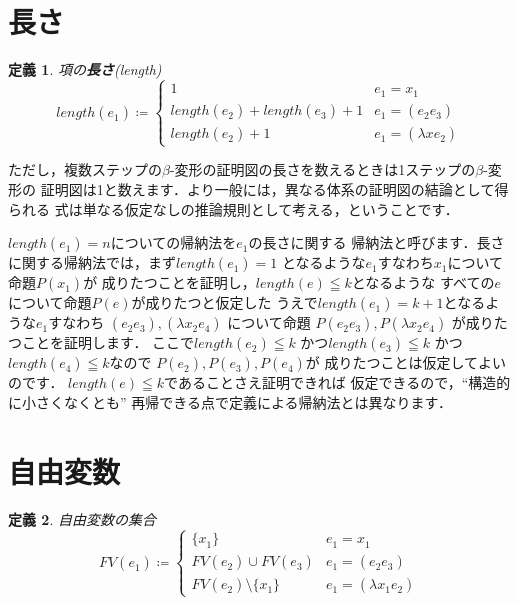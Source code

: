 \documentclass{ltjsbook}%
\newtheorem{definition}{定義}[section]%
\newcommand\term[2]{\textbf{#1}{(\textit{#2})}}%
\begin{document}
\section{長さ}%
\label{sect:length}%
\begin{definition}%
項の\term{長さ}{length}%
\begin{equation}%
  length(\mathit{e}_1^{}) \coloneqq \begin{cases}%
    1 & \mathit{e}_1^{} = \mathit{x}_1^{}\\%
    length(\mathit{e}_2^{}) + length(\mathit{e}_3^{}) + 1%
    & \mathit{e}_1^{} = (\mathit{e}_2^{}\mathit{e}_3^{})\\%
    length(\mathit{e}_2^{}) + 1 & \mathit{e}_1^{} = (\lambda\mathit{x}\mathit{e}_2^{})%
  \end{cases}%
\end{equation}%
\end{definition}%
\par ただし，複数ステップの$\beta$-変形の証明図の長さを数えるときは1ステップの$\beta$-変形の%
証明図は1と数えます．より一般には，異なる体系の証明図の結論として得られる%
式は単なる仮定なしの推論規則として考える，ということです．%
\par$length(\mathit{e}_1^{})=n$についての帰納法を$\mathit{e}_1^{}$の長さに関する%
帰納法と呼びます．長さに関する帰納法では，まず$length(\mathit{e}_1^{}) = 1$%
となるような$\mathit{e}_1^{}$すなわち$\mathit{x}_1^{}$について命題$P(\mathit{x}_1^{})$が%
成りたつことを証明し，$length(\mathit{e})\leqq k$となるような%
すべての$\mathit{e}$について命題$P(\mathit{e})$が成りたつと仮定した%
うえで$length(\mathit{e}_1^{}) = k + 1$となるような$\mathit{e}_1^{}$すなわち%
$(\mathit{e}_2^{}\mathit{e}_3^{}),(\lambda\mathit{x}_2^{}\mathit{e}_4^{})$%
について命題%
$P(\mathit{e}_2^{}\mathit{e}_3^{}),P(\lambda\mathit{x}_2^{}\mathit{e}_4^{})$%
が成りたつことを証明します．%
ここで$length(\mathit{e}_2^{})\leqq k$%
かつ$length(\mathit{e}_3^{})\leqq k$%
かつ$length(\mathit{e}_4^{})\leqq k$なので%
$P(\mathit{e}_2^{}),P(\mathit{e}_3^{}),P(\mathit{e}_4^{})$が%
成りたつことは仮定してよいのです．%
$length(\mathit{e})\leqq k$であることさえ証明できれば%
仮定できるので，``構造的に小さくなくとも''%
再帰できる点で定義による帰納法とは異なります．%
\section{自由変数}%
\label{untyped:fv}%
\begin{definition}%
自由変数の集合%
\begin{equation}%
  FV(\mathit{e}_1^{}) \coloneqq \begin{cases}%
    \{\mathit{x}_1^{}\} & \mathit{e}_1^{} = \mathit{x}_1^{}\\%
    FV(\mathit{e}_2^{})\cup FV(\mathit{e}_3^{})%
    & \mathit{e}_1^{} = (\mathit{e}_2^{}\mathit{e}_3^{})\\%
    FV(\mathit{e}_2^{})\setminus\{\mathit{x}_1^{}\}%
    & \mathit{e}_1^{} = (\lambda\mathit{x}_1^{}\mathit{e}_2^{})%
  \end{cases}%
\end{equation}%
\end{definition}%
\end{document}
